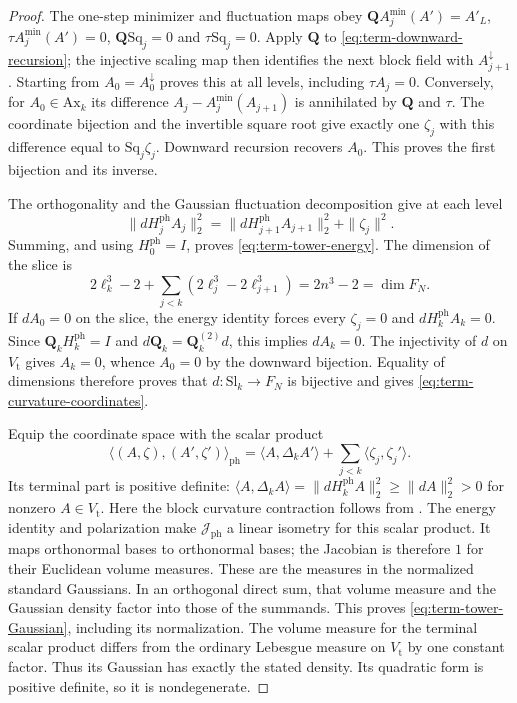 \documentclass[11pt,letterpaper,reqno]{amsart}
\begin{document}
\begin{proof}
The one-step minimizer and fluctuation maps obey
$\mathbf QA_j^{\min}(A')=A'_L$, $\tau A_j^{\min}(A')=0$,
$\mathbf Q\mathrm{Sq}_j=0$ and $\tau\mathrm{Sq}_j=0$.
Apply $\mathbf Q$ to \eqref{eq:term-downward-recursion};
the injective scaling map then identifies the next
block field with $A_{j+1}^\downarrow$.
Starting from $A_0=A_0^\downarrow$ proves this at all
levels, including $\tau A_j=0$.
Conversely, for $A_0\in\mathrm{Ax}_k$ its difference
$A_j-A_j^{\min}(A_{j+1})$ is annihilated by $\mathbf Q$ and
$\tau$. The coordinate bijection
\cite[(21)]{MaxwellBlock} and the invertible
square root give exactly one $\zeta_j$ with this
difference equal to $\mathrm{Sq}_j\zeta_j$.
Downward recursion recovers $A_0$.
This proves the first bijection and its inverse.

The orthogonality
\cite[(28)]{MaxwellBlock}
and the Gaussian fluctuation decomposition give
at each level
\[
 \|dH_j^{\mathrm{ph}}A_j\|_2^2
       =\|dH_{j+1}^{\mathrm{ph}}A_{j+1}\|_2^2+\|\zeta_j\|^2 .
\]
Summing, and using $H_0^{\mathrm{ph}}=I$, proves
\eqref{eq:term-tower-energy}.
The dimension of the slice is
\[
 2\ell_k^3-2+\sum_{j<k}(2\ell_j^3-2\ell_{j+1}^3)
                                                    =2n^3-2=\dim F_N.
\]
If $dA_0=0$ on the slice, the energy identity forces
every $\zeta_j=0$ and $dH_k^{\mathrm{ph}}A_k=0$.
Since $\mathbf Q_kH_k^{\mathrm{ph}}=I$ and
$d\mathbf Q_k=\mathbf Q_k^{(2)}d$,
this implies $dA_k=0$.
The injectivity of $d$ on $V_{\mathrm t}$ gives
$A_k=0$, whence $A_0=0$ by the downward bijection.
Equality of dimensions therefore proves that
$d:\mathrm{Sl}_k\to F_N$ is bijective and gives
\eqref{eq:term-curvature-coordinates}.

Equip the coordinate space with the scalar product
\[
 \langle(A,\zeta),(A',\zeta')\rangle_{\mathrm{ph}}
       =\langle A,\Delta_kA'\rangle
                                      +\sum_{j<k}\langle\zeta_j,\zeta_j'\rangle.
\]
Its terminal part is positive definite:
$\langle A,\Delta_kA\rangle
=\|dH_k^{\mathrm{ph}}A\|_2^2\ge\|dA\|_2^2>0$
for nonzero $A\in V_{\mathrm t}$.
Here the block curvature contraction follows from
\cite[(5)]{MaxwellBlock}.
The energy identity and polarization make
$\mathcal J_{\mathrm{ph}}$ a linear isometry for
this scalar product.
It maps orthonormal bases to orthonormal bases;
the Jacobian is therefore $1$ for their Euclidean
volume measures. These are the measures in the
normalized standard Gaussians.
In an orthogonal direct sum, that volume measure
and the Gaussian density factor into those of
the summands. This proves
\eqref{eq:term-tower-Gaussian}, including its normalization.
The volume measure for the terminal scalar product
differs from the ordinary Lebesgue measure on
$V_{\mathrm t}$ by one constant factor.
Thus its Gaussian has exactly the stated density.
Its quadratic form is positive definite, so it is
nondegenerate.


\end{proof}
\end{document}
